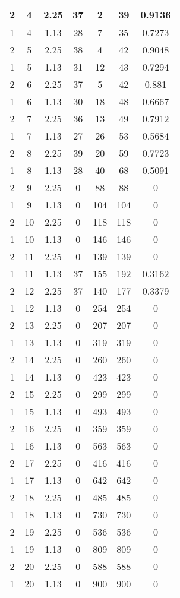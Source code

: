 \documentclass[letterpaper, 12pt]{article}
\begin{document}
\begin{longtable}{|c|c|c|c|c|c|c|}
\hline
2 & 4 & 2.25 & 37 & 2 & 39 & 0.9136 \\
\hline
1 & 4 & 1.13 & 28 & 7 & 35 & 0.7273 \\
\hline
2 & 5 & 2.25 & 38 & 4 & 42 & 0.9048 \\
\hline
1 & 5 & 1.13 & 31 & 12 & 43 & 0.7294 \\
\hline
2 & 6 & 2.25 & 37 & 5 & 42 & 0.881 \\
\hline
1 & 6 & 1.13 & 30 & 18 & 48 & 0.6667 \\
\hline
2 & 7 & 2.25 & 36 & 13 & 49 & 0.7912 \\
\hline
1 & 7 & 1.13 & 27 & 26 & 53 & 0.5684 \\
\hline
2 & 8 & 2.25 & 39 & 20 & 59 & 0.7723 \\
\hline
1 & 8 & 1.13 & 28 & 40 & 68 & 0.5091 \\
\hline
2 & 9 & 2.25 & 0 & 88 & 88 & 0 \\
\hline
1 & 9 & 1.13 & 0 & 104 & 104 & 0 \\
\hline
2 & 10 & 2.25 & 0 & 118 & 118 & 0 \\
\hline
1 & 10 & 1.13 & 0 & 146 & 146 & 0 \\
\hline
2 & 11 & 2.25 & 0 & 139 & 139 & 0 \\
\hline
1 & 11 & 1.13 & 37 & 155 & 192 & 0.3162 \\
\hline
2 & 12 & 2.25 & 37 & 140 & 177 & 0.3379 \\
\hline
1 & 12 & 1.13 & 0 & 254 & 254 & 0 \\
\hline
2 & 13 & 2.25 & 0 & 207 & 207 & 0 \\
\hline
1 & 13 & 1.13 & 0 & 319 & 319 & 0 \\
\hline
2 & 14 & 2.25 & 0 & 260 & 260 & 0 \\
\hline
1 & 14 & 1.13 & 0 & 423 & 423 & 0 \\
\hline
2 & 15 & 2.25 & 0 & 299 & 299 & 0 \\
\hline
1 & 15 & 1.13 & 0 & 493 & 493 & 0 \\
\hline
2 & 16 & 2.25 & 0 & 359 & 359 & 0 \\
\hline
1 & 16 & 1.13 & 0 & 563 & 563 & 0 \\
\hline
2 & 17 & 2.25 & 0 & 416 & 416 & 0 \\
\hline
1 & 17 & 1.13 & 0 & 642 & 642 & 0 \\
\hline
2 & 18 & 2.25 & 0 & 485 & 485 & 0 \\
\hline
1 & 18 & 1.13 & 0 & 730 & 730 & 0 \\
\hline
2 & 19 & 2.25 & 0 & 536 & 536 & 0 \\
\hline
1 & 19 & 1.13 & 0 & 809 & 809 & 0 \\
\hline
2 & 20 & 2.25 & 0 & 588 & 588 & 0 \\
\hline
1 & 20 & 1.13 & 0 & 900 & 900 & 0 \\
\hline
\end{longtable}
\end{document}
